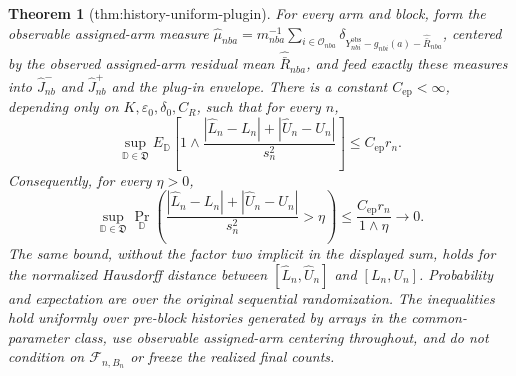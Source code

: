 \documentclass{article}
\newtheorem{theorem}{Theorem}
\begin{document}
\begin{theorem}[thm:history-uniform-plugin]\label{thm:history-uniform-plugin}
For every arm and block, form the observable assigned-arm measure \(\widehat\mu_{nba}=m_{nba}^{-1}\sum_{i\in\mathcal O_{nba}}\delta_{Y_{nbi}^{\mathrm{obs}}-g_{nbi}(a)-\widehat{\bar R}_{nba}}\), centered by the observed assigned-arm residual mean \(\widehat{\bar R}_{nba}\), and feed exactly these measures into \(\widehat J_{nb}^{-}\) and \(\widehat J_{nb}^{+}\) and the plug-in envelope. There is a constant \(C_{\mathrm{ep}}<\infty\), depending only on \(K,\varepsilon_0,\delta_0,C_R\), such that for every \(n\), \[\sup_{\mathbb D\in\mathfrak D}E_{\mathbb D}\left[1\wedge\frac{|\widehat L_n-L_n|+|\widehat U_n-U_n|}{s_n^2}\right]\le C_{\mathrm{ep}}r_n.\] Consequently, for every \(\eta>0\), \[\sup_{\mathbb D\in\mathfrak D}\Pr_{\mathbb D}\left(\frac{|\widehat L_n-L_n|+|\widehat U_n-U_n|}{s_n^2}>\eta\right)\le\frac{C_{\mathrm{ep}}r_n}{1\wedge\eta}\longrightarrow0.\] The same bound, without the factor two implicit in the displayed sum, holds for the normalized Hausdorff distance between \([\widehat L_n,\widehat U_n]\) and \([L_n,U_n]\). Probability and expectation are over the original sequential randomization. The inequalities hold uniformly over pre-block histories generated by arrays in the common-parameter class, use observable assigned-arm centering throughout, and do not condition on \(\mathcal F_{n,B_n}\) or freeze the realized final counts.
\end{theorem}
\end{document}
